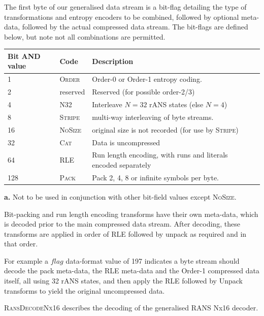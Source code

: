 \documentclass[a4paper]{article}
\begin{document}
The first byte of our generalised data stream is a bit-flag detailing the type of transformations and entropy encoders to be combined, followed by optional meta-data, followed by the actual compressed data stream.
The bit-flags are defined below, but note not all combinations are permitted.

\begin{threeparttable}[t]
\begin{tabular}{llll}
\hline
\textbf{Bit AND value} & \textbf{Code} & \textbf{Description} \\
\hline
1 & \textsc{Order} & Order-0 or Order-1 entropy coding. \\
2 & reserved & Reserved (for possible order-2/3)\\
4 & \textsc{N32} & Interleave $N=32$ rANS states (else $N=4$)\\
8 & \textsc{Stripe}\tnote{\textbf{a}} & multi-way interleaving of byte streams.\\
16 & \textsc{NoSize} & original size is not recorded (for use by \textsc{Stripe})\\
32 & \textsc{Cat} & Data is uncompressed\\
64 & \textsc{RLE} & Run length encoding, with runs and literals encoded separately\\
128 & \textsc{Pack} & Pack 2, 4, 8 or infinite symbols per byte.\\
\hline
\end{tabular}
\begin{tablenotes}
\item{\textbf{a.}} Not to be used in conjunction with other bit-field
  values except \textsc{NoSize}.
\end{tablenotes}
\end{threeparttable}

Bit-packing and run length encoding transforms have their own
meta-data, which is decoded prior to the main compressed data stream.
After decoding, these transforms are applied in order of RLE followed
by unpack as required and in that order.

For example a $flag$ data-format value of 197 indicates a byte stream
should decode the pack meta-data, the RLE meta-data and the Order-1 compressed
data itself, all using 32 rANS states, and then apply the RLE followed
by Unpack transforms to yield the original uncompressed data.

\textsc{RansDecodeNx16} describes the decoding of the generalised RANS Nx16 decoder.
\end{document}
